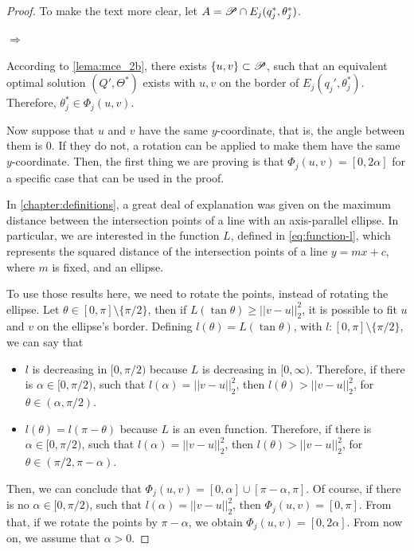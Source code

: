 \begin{proof}
	To make the text more clear, let $A=\mathscr{P}\cap E_j(q^*_j, \theta^*_j)$.
	
	$\Rightarrow$
	
	According to \autoref{lema:mce_2b}, there exists $\{u, v\} \subset \mathscr{P}$, such that an equivalent optimal solution $(Q', \Theta^*)$ exists with $u, v$ on the border of $E_j(q_j', \theta_j^*)$. Therefore, $\theta_j^*\in\Phi_j(u,v)$.
	
	Now suppose that $u$ and $v$ have the same $y$-coordinate, that is, the angle between them is $0$. If they do not, a rotation can be applied to make them have the same $y$-coordinate. Then, the first thing we are proving is that $\Phi_j(u, v) = [0, 2\alpha]$ for a specific case that can be used in the proof.
	
	In \autoref{chapter:definitions}, a great deal of explanation was given on the maximum distance between the intersection points of a line with an axis-parallel ellipse. In particular, we are interested in the function $L$, defined in \autoref{eq:function-l}, which represents the squared distance of the intersection points of a line  $y=mx + c$, where $m$ is fixed, and an ellipse.
	
	To use those results here, we need to rotate the points, instead of rotating the ellipse. Let $\theta \in [0, \pi]\setminus\{\pi/2\}$, then if $L(\tan{\theta}) \ge ||v-u||_2^2$, it is possible to fit $u$ and $v$ on the ellipse's border. Defining $l(\theta)=L(\tan{\theta})$, with $l:[0, \pi]\setminus\{\pi/2\}$, we can say that
	
	\begin{itemize}
		\item $l$ is decreasing in $[0, \pi/2)$ because $L$ is decreasing in $[0, \infty)$. Therefore, if there is $\alpha\in[0, \pi/2)$, such that $l(\alpha) = ||v-u||_2^2$, then $l(\theta)>||v-u||_2^2$, for $\theta\in(\alpha, \pi/2)$.
		\item $l(\theta) = l(\pi-\theta)$ because $L$ is an even function. Therefore, if there is $\alpha\in[0, \pi/2)$, such that $l(\alpha) = ||v-u||_2^2$, then $l(\theta)>||v-u||_2^2$, for $\theta\in(\pi/2,\pi-\alpha)$.
	\end{itemize}
	Then, we can conclude that $\Phi_j(u, v) = [0, \alpha]\cup [\pi-\alpha, \pi]$. Of course, if there is no $\alpha\in[0, \pi/2)$, such that $l(\alpha)=||v-u||_2^2$, then $\Phi_j(u,v)=[0, \pi]$.
	From that, if we rotate the points by $\pi-\alpha$, we obtain $\Phi_j(u,v)=[0, 2\alpha]$. From now on, we assume that $\alpha>0$.
	

\end{proof}
